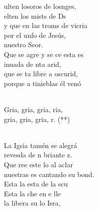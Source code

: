 \begin{cancion}%
	ulten losoros de losnges, \\
	elten los mists de Ds \\
	y que en las troms de vicria\\
	por el unfo de Jesús, \\
	nuestro Seor.\\
	Que se agre y se ce esta es\\
	inuada de nta arid, \\
	que se ta libre a oscurid,\\
	porque a  tinieblas él venó\\\jump\\
	\begin{chorus}%
	Gria, gria, gria, ria,\\
	gria, gria, gria, r. (**)\\
	\end{chorus}%
	\jump\\
	La Igsia tamén se alegrá\\
	revesda de n briante z.\\
	Que ree este lo al aclar\\
	nuestras es cantando su bond.\\
	Esta  la esta de la scu\\
	Esta  la che en e lle  \\
	la libera su lo Isra,\\

\end{cancion}

